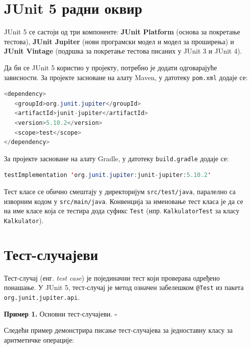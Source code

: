 \section{JUnit 5 радни оквир}

JUnit 5 се састоји од три компоненте: \textbf{JUnit Platform} (основа за покретање тестова), \textbf{JUnit Jupiter} (нови програмски модел и модел за проширења) и \textbf{JUnit Vintage} (подршка за покретање тестова писаних у JUnit 3 и JUnit 4).

Да би се JUnit 5 користио у пројекту, потребно је додати одговарајуће зависности. За пројекте засноване на алату Maven, у датотеку \texttt{pom.xml} додаје се:


\begin{lstlisting}[language=Java]
<dependency>
   <groupId>org.junit.jupiter</groupId>
   <artifactId>junit-jupiter</artifactId>
   <version>5.10.2</version>
   <scope>test</scope>
</dependency>
\end{lstlisting}


За пројекте засноване на алату Gradle, у датотеку \texttt{build.gradle} додаје се:


\begin{lstlisting}[language=Java]
testImplementation 'org.junit.jupiter:junit-jupiter:5.10.2'
\end{lstlisting}


Тест класе се обично смештају у директоријум \texttt{src/test/java}, паралелно са изворним кодом у \texttt{src/main/java}. Конвенција за именовање тест класа је да се на име класе која се тестира дода суфикс \texttt{Test} (нпр. \texttt{KalkulatorTest} за класу \texttt{Kalkulator}).


\section{Тест-случајеви}

Тест-случај (енг. \textit{test case}) је појединачни тест који проверава одређено понашање. У JUnit 5, тест-случај је метод означен забелешком \texttt{@Test} из пакета \texttt{org.junit.jupiter.api}.


\bigskip

\noindent \textbf{Пример 1.} Основни тест-случајеви. $\square$

\medskip

Следећи пример демонстрира писање тест-случајева за једноставну класу за аритметичке операције:


